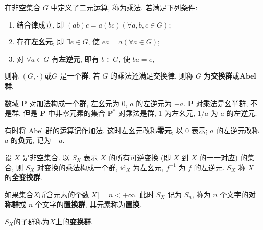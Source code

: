 \documentclass[../../main.tex]{subfiles}
\begin{document}
\begin{definition}[群]
在非空集合 \( G \) 中定义了二元运算, 称为乘法. 若满足下列条件:
\begin{enumerate}[(1)]
\item 结合律成立, 即 \( (ab)c = a(bc) (\forall a,b,c \in G) \);

\item 存在\textbf{左幺元}, 即 \( \exists e \in G \), 使 \( ea = a (\forall a \in G) \);

\item 对 \( \forall a \in G \) 有\textbf{左逆元}, 即有 \( b \in G \), 使 \( ba = e \),
\end{enumerate}
则称 $(G,\cdot)$或\( G \) 是一个\textbf{群}. 若 \( G \) 的乘法还满足交换律, 则称 \( G \) 为\textbf{交换群}或$\mathbf{Abel}$\textbf{群}.
\end{definition}
\begin{remark}
数域 $\mathbf{P}$ 对加法构成一个群, 左幺元为 $0$, $a$ 的左逆元为 $-a$. $\mathbf{P}$ 对乘法是幺半群, 不是群. 但是 $\mathbf{P}$ 中非零元素的集合 $\mathbf{P}^*$ 对乘法是群, $1$ 为左幺元, $1/a$ 为 $a$ 的左逆元.

有时将 Abel 群的运算记作加法. 这时左幺元改称\textbf{零元}, 以 $0$ 表示; $a$ 的左逆元改称 $a$ 的\textbf{负元}, 记为 $-a$.
\end{remark}

\begin{definition}
设 \( X \) 是非空集合. 以 \( S_X \) 表示 \( X \) 的所有可逆变换 (即 \( X \) 到 \( X \) 的一一对应) 的集合, 则 \( S_X \) 对变换的乘法构成一个群, \( \text{id}_X \) 为左幺元, \( f^{-1} \) 为 \( f \) 的左逆元. \( S_X \) 称 \( X \) 的\textbf{全变换群}.

如果集合$X$所含元素的个数\( |X| = n < +\infty \). 此时 \( S_X \) 记为 \( S_n \), 称为 \( n \) 个文字的\textbf{对称群}或 \( n \) 个文字的\textbf{置换群}, 其元素称为\textbf{置换}.
\end{definition}
\begin{remark}
$S_X$的子群称为$X$上的\textbf{变换群}.
\end{remark}
\end{document}
